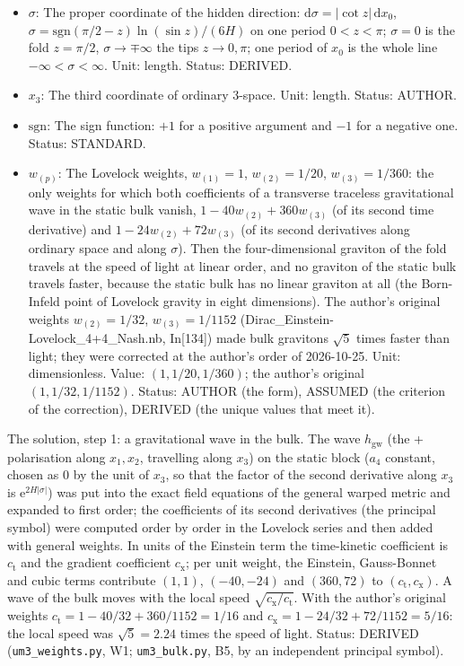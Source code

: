 \documentclass[
  10pt,
]{article}
\begin{document}
\begin{itemize}
\item
  \(\sigma\): The proper coordinate of the hidden direction:
  \(\mathrm{d}\sigma = \lvert\cot z\rvert\,\mathrm{d}x_0\),
  \(\sigma = \mathrm{sgn}(\pi/2 - z)\ln(\sin z)/(6H)\) on one period
  \(0 < z < \pi\); \(\sigma = 0\) is the fold \(z = \pi/2\),
  \(\sigma \to \mp\infty\) the tips \(z \to 0, \pi\); one period of
  \(x_0\) is the whole line \(-\infty < \sigma < \infty\). Unit: length.
  Status: DERIVED.
\item
  \(x_3\): The third coordinate of ordinary 3-space. Unit: length.
  Status: AUTHOR.
\item
  \(\mathrm{sgn}\): The sign function: \(+1\) for a positive argument
  and \(-1\) for a negative one. Status: STANDARD.
\item
  \(w_{(p)}\): The Lovelock weights, \(w_{(1)} = 1\),
  \(w_{(2)} = 1/20\), \(w_{(3)} = 1/360\): the only weights for which
  both coefficients of a transverse traceless gravitational wave in the
  static bulk vanish, \(1 - 40w_{(2)} + 360w_{(3)}\) (of its second time
  derivative) and \(1 - 24w_{(2)} + 72w_{(3)}\) (of its second
  derivatives along ordinary space and along \(\sigma\)). Then the
  four-dimensional graviton of the fold travels at the speed of light at
  linear order, and no graviton of the static bulk travels faster,
  because the static bulk has no linear graviton at all (the Born-Infeld
  point of Lovelock gravity in eight dimensions). The author's original
  weights \(w_{(2)} = 1/32\), \(w_{(3)} = 1/1152\)
  (Dirac\_Einstein-Lovelock\_4+4\_Nash.nb, In{[}134{]}) made bulk
  gravitons \(\sqrt5\) times faster than light; they were corrected at
  the author's order of 2026-10-25. Unit: dimensionless. Value:
  \((1, 1/20, 1/360)\); the author's original \((1, 1/32, 1/1152)\).
  Status: AUTHOR (the form), ASSUMED (the criterion of the correction),
  DERIVED (the unique values that meet it).
\end{itemize}

The solution, step 1: a gravitational wave in the bulk. The wave
\(h_{\mathrm{gw}}\) (the + polarisation along \(x_1, x_2\), travelling
along \(x_3\)) on the static block (\(a_4\) constant, chosen as 0 by the
unit of \(x_3\), so that the factor of the second derivative along
\(x_3\) is \(\mathrm{e}^{2H\lvert\sigma\rvert}\)) was put into the exact
field equations of the general warped metric and expanded to first
order; the coefficients of its second derivatives (the principal symbol)
were computed order by order in the Lovelock series and then added with
general weights. In units of the Einstein term the time-kinetic
coefficient is \(c_{\mathrm{t}}\) and the gradient coefficient
\(c_{\mathrm{x}}\); per unit weight, the Einstein, Gauss-Bonnet and
cubic terms contribute \((1, 1)\), \((-40, -24)\) and \((360, 72)\) to
\((c_{\mathrm{t}}, c_{\mathrm{x}})\). A wave of the bulk moves with the
local speed \(\sqrt{c_{\mathrm{x}}/c_{\mathrm{t}}}\). With the author's
original weights \(c_{\mathrm{t}} = 1 - 40/32 + 360/1152 = 1/16\) and
\(c_{\mathrm{x}} = 1 - 24/32 + 72/1152 = 5/16\): the local speed was
\(\sqrt5 = 2.24\) times the speed of light. Status: DERIVED
(\texttt{um3\_weights.py}, W1; \texttt{um3\_bulk.py}, B5, by an
independent principal symbol).
\end{document}
